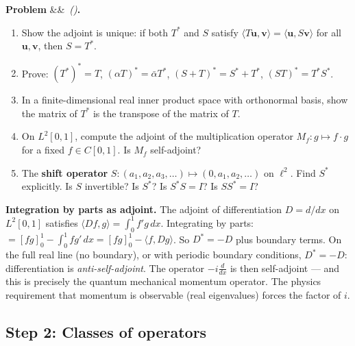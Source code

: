\documentclass[12pt,a4paper]{article}
\newcounter{problem}
\newenvironment{problem}[1][]{\refstepcounter{problem}\par\vspace{6pt}\noindent\textbf{\color{MidBlue}Problem \theproblem}\ifx&#1&\else\ \textit{(#1)}\fi\textbf{.}\enskip}{\par\vspace{4pt}}
\begin{document}
\begin{problem}
\label{prob:adjoint_def}
\begin{enumerate}[label=(\alph*),topsep=2pt]
  \item Show the adjoint is unique: if both $T^*$ and $S$ satisfy $\langle T\mathbf{u},\mathbf{v}\rangle = \langle\mathbf{u},S\mathbf{v}\rangle$ for all $\mathbf{u},\mathbf{v}$, then $S = T^*$.
  \item Prove: $(T^*)^* = T$, $(\alpha T)^* = \bar\alpha T^*$, $(S+T)^* = S^*+T^*$, $(ST)^* = T^*S^*$.
  \item In a finite-dimensional real inner product space with orthonormal basis, show the matrix of $T^*$ is the transpose of the matrix of $T$.
  \item On $L^2[0,1]$, compute the adjoint of the multiplication operator $M_f: g\mapsto f\cdot g$ for a fixed $f\in C[0,1]$. Is $M_f$ self-adjoint?
  \item The \textbf{shift operator} $S:(a_1,a_2,a_3,\ldots)\mapsto(0,a_1,a_2,\ldots)$ on $\ell^2$. Find $S^*$ explicitly. Is $S$ invertible? Is $S^*$? Is $S^*S = I$? Is $SS^* = I$?
\end{enumerate}
\end{problem}

\begin{thought}
\textbf{Integration by parts as adjoint.}
The adjoint of differentiation $D = d/dx$ on $L^2[0,1]$ satisfies $\langle Df,g\rangle = \int_0^1 f'g\,dx$. Integrating by parts: $= [fg]_0^1 - \int_0^1 fg'\,dx = [fg]_0^1 - \langle f,Dg\rangle$. So $D^* = -D$ plus boundary terms. On the full real line (no boundary), or with periodic boundary conditions, $D^* = -D$: differentiation is \emph{anti-self-adjoint}. The operator $-i\frac{d}{dx}$ is then self-adjoint --- and this is precisely the quantum mechanical momentum operator. The physics requirement that momentum is observable (real eigenvalues) forces the factor of $i$.
\end{thought}

\subsection{Step 2: Classes of operators}
\end{document}
